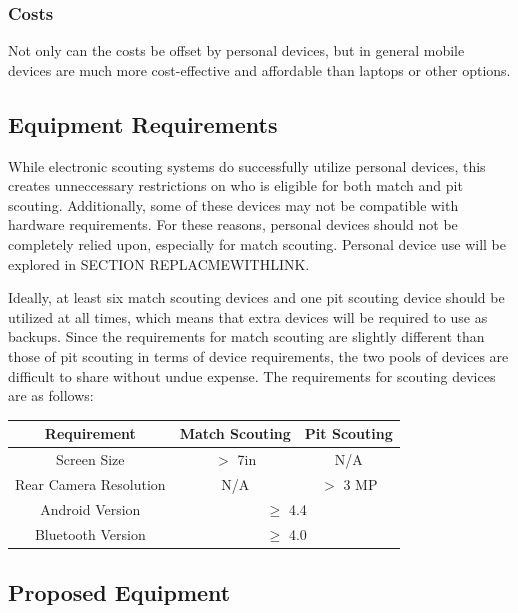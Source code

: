 \documentclass[11pt]{report}
\begin{document}
\subsubsection*{Costs}

Not only can the costs be offset by personal devices, but in general mobile devices are much more cost-effective and affordable than laptops or other options.

\subsection{Equipment Requirements}

While electronic scouting systems do successfully utilize personal devices, this creates unneccessary restrictions on who is eligible for both match and pit scouting. Additionally, some of these devices may not be compatible with hardware requirements. For these reasons, personal devices should not be completely relied upon, especially for match scouting. Personal device use will be explored in SECTION REPLACMEWITHLINK. \newline

Ideally, at least six match scouting devices and one pit scouting device should be utilized at all times, which means that extra devices will be required to use as backups. Since the requirements for match scouting are slightly different than those of pit scouting in terms of device requirements, the two pools of devices are difficult to share without undue expense. The requirements for scouting devices are as follows: 

\begin{center}
 \begin{tabular}{||c|c|c||} 
 \hline
 Requirement & Match Scouting & Pit Scouting \\  [0.5ex] 
 \hline \hline
 Screen Size & $>$ 7in & N/A \\ 
 \hline
 Rear Camera Resolution & N/A & $>$ 3 MP \\ 
 \hline
 Android Version & \multicolumn{2}{|c||}{$\geq$ 4.4}  \\
 \hline
 Bluetooth Version & \multicolumn{2}{|c||}{$\geq$ 4.0} \\  [1ex] 
 \hline
\end{tabular}
\end{center}

\subsection{Proposed Equipment}
\end{document}
